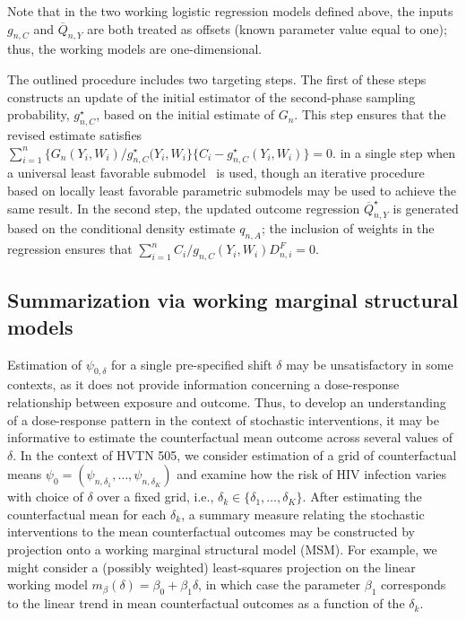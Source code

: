 Note that in the two working logistic regression models defined above, the
inputs $g_{n,C}$ and $\overline{Q}_{n,Y}$ are both treated as offsets (known
parameter value equal to one); thus, the working models are one-dimensional.

The outlined procedure includes two targeting steps. The first of these steps
constructs an update of the initial estimator of the second-phase sampling
probability, $g_{n,C}^{\star}$, based on the initial estimate of $G_n$. This
step ensures that the revised estimate satisfies $\sum_{i=1}^n \{G_n(Y_i, W_i)
/ g_{n,C}^{\star}(Y_i,W_i\} \{C_i - g_{n,C}^{\star}(Y_i, W_i)\} = 0$. in
a single step when a universal least favorable submodel~\citep{vdl2016one} is
used, though an iterative procedure based on locally least favorable parametric
submodels may be used to achieve the same result. In the second step, the
updated outcome regression $\overline{Q}_{n,Y}^{\star}$ is generated based on
the conditional density estimate $q_{n,A}$; the inclusion of weights in the
regression ensures that $\sum_{i=1}^n C_i/g_{n,C}(Y_i, W_i) D_{n,i}^F = 0$.

\subsection{Summarization via working marginal structural
models}\label{msm_summary}

Estimation of $\psi_{0,\delta}$ for a single pre-specified shift $\delta$ may be
unsatisfactory in some contexts, as it does not provide information concerning
a dose-response relationship between exposure and outcome. Thus, to develop an
understanding of a dose-response pattern in the context of stochastic
interventions, it may be informative to estimate the counterfactual mean outcome
across several values of $\delta$. In the context of HVTN 505, we consider
estimation of a grid of counterfactual means $\psi_0 = (\psi_{n,\delta_1},
\ldots, \psi_{n,\delta_K})$ and examine how the risk of HIV infection varies
with choice of $\delta$ over a fixed grid, i.e., $\delta_k \in \{\delta_1,
\ldots, \delta_K\}$. After estimating the counterfactual mean for each
$\delta_k$, a summary measure relating the stochastic
interventions to the mean counterfactual outcomes may be constructed by
projection onto a working marginal structural model (MSM). For example, we might
consider a (possibly weighted) least-squares projection on the linear working
model $m_{\beta}(\delta) = \beta_0 + \beta_1 \delta$, in which case the
parameter $\beta_1$ corresponds to the linear trend in mean counterfactual
outcomes as a function of the $\delta_k$.

